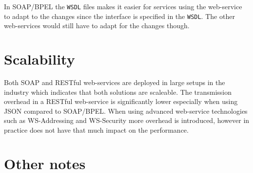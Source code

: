 In SOAP/BPEL the \texttt{WSDL} files makes it easier for services using the web-service to adapt to the changes since the interface is specified in the \texttt{WSDL}. The other web-services would still have to adapt for the changes though.

\section{Scalability}
Both SOAP and RESTful web-services are deployed in large setups in the industry which indicates that both solutions are scaleable. The transmission overhead in a RESTful web-service is significantly lower especially when using JSON compared to SOAP/BPEL. When using advanced web-service technologies such as WS-Addressing and WS-Security more overhead is introduced, however in practice does not have that much impact on the performance. 

\section{Other notes}
